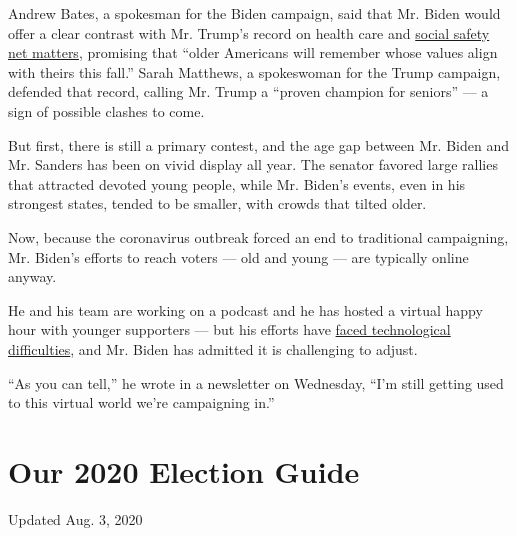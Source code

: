 Andrew Bates, a spokesman for the Biden campaign, said that Mr. Biden
would offer a clear contrast with Mr. Trump's record on health care and
\href{https://www.nytimes3xbfgragh.onion/2020/01/22/us/politics/medicare-trump.html}{social
safety net matters}, promising that ``older Americans will remember
whose values align with theirs this fall.'' Sarah Matthews, a
spokeswoman for the Trump campaign, defended that record, calling Mr.
Trump a ``proven champion for seniors'' --- a sign of possible clashes
to come.

But first, there is still a primary contest, and the age gap between Mr.
Biden and Mr. Sanders has been on vivid display all year. The senator
favored large rallies that attracted devoted young people, while Mr.
Biden's events, even in his strongest states, tended to be smaller, with
crowds that tilted older.

Now, because the coronavirus outbreak forced an end to traditional
campaigning, Mr. Biden's efforts to reach voters --- old and young ---
are typically online anyway.

He and his team are working on a podcast and he has hosted a virtual
happy hour with younger supporters --- but his efforts have
\href{https://www.nytimes3xbfgragh.onion/2020/03/13/us/politics/joe-biden-digital-campaign.html}{faced
technological difficulties}, and Mr. Biden has admitted it is
challenging to adjust.

``As you can tell,'' he wrote in a newsletter on Wednesday, ``I'm still
getting used to this virtual world we're campaigning in.''

\hypertarget{our-2020-election-guide}{%
\section{Our 2020 Election Guide}\label{our-2020-election-guide}}

Updated Aug. 3, 2020

